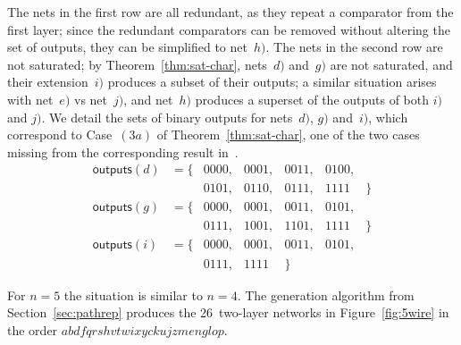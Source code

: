 \documentclass[10pt]{IEEEtran}
\newcommand{\outputs}{\mathsf{outputs}}
\begin{document}
The nets in the first row are all redundant, as they repeat a
comparator from the first layer; since the redundant comparators can
be removed without altering the set of outputs, they can be simplified to
net~$h)$.
The nets in the second row are not saturated; by
Theorem~\ref{thm:sat-char}, nets~$d)$ and~$g)$ are not saturated, and
their extension~$i)$ produces a subset of their outputs;
a similar situation arises with net~$e)$ vs net~$j)$, and net~$h)$
produces a superset of the outputs of both $i)$ and $j)$.  We detail the sets of
binary outputs for nets~$d)$, $g)$ and~$i)$, which correspond to
Case~$(3a)$ of Theorem~\ref{thm:sat-char}, one of the two cases missing
from the corresponding result in~\cite{DBLP:conf/lata/BundalaZ14}.
\[\begin{array}{rlcccccccccc}
\outputs(d) &= \{&0000,&0001,&0011,&0100,\\&&0101,&0110,&0111,&1111\phantom{,}&\} \\
\outputs(g) &= \{&0000,&0001,&0011,&0101,\\&&0111,&1001,&1101,&1111\phantom{,}&\} \\
\outputs(i) &= \{&0000,&0001,&0011,&0101,\\&&0111,&1111\phantom{,}&\}
\end{array}\]



For $n=5$ the situation is similar to $n=4$.  The generation algorithm from Section~\ref{sec:pathrep} produces the
26~two-layer networks in Figure~\ref{fig:5wire} in the order
$abdfqrshvtwixyckujzmenglop$.
\end{document}
